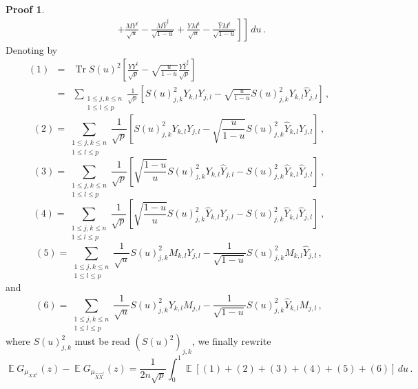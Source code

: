 \documentclass[11pt,a4paper]{article}
\DeclareMathOperator{\E}{\mathbb{E}}
\DeclareMathOperator{\1}{\mathbf{1}}
\DeclareMathOperator{\Tr}{\mathrm{Tr}}
\newcommand{\Xhat}{\widehat{X}}
\newcommand{\Yhat}{\widehat{Y}}
\theoremstyle{definition}
\newtheorem*{Proof}{Proof}
\begin{document}
\begin{Proof}
\begin{eqnarray*}
& & \quad \left. \left. + \frac{MY^t}{\sqrt{u}} - \frac{M\Yhat^t}{\sqrt{1-u}} + \frac{YM^t}{\sqrt{u}} - \frac{\Yhat M^t}{\sqrt{1-u}} \right] \right] \, du \, .
\end{eqnarray*}
Denoting by
\begin{eqnarray*}
(1) & = & \Tr S(u)^2 \left[ \frac{YY^t}{\sqrt{p}} - \sqrt{\frac{u}{1-u}} \frac{Y\Yhat^t}{\sqrt{p}} \right] \\
& = & \sum_{\substack{1 \le j,k \le n \\ 1 \le l \le p}} \frac{1}{\sqrt{p}} \left[ S(u)^2_{j,k} Y_{k,l} Y_{j,l} - \sqrt{\frac{u}{1-u}} S(u)^2_{j,k} Y_{k,l} \Yhat_{j,l} \right] \, ,
\end{eqnarray*}
\begin{displaymath}
(2) = \sum_{\substack{1 \le j,k \le n \\ 1 \le l \le p}} \frac{1}{\sqrt{p}} \left[ S(u)^2_{j,k} Y_{k,l} Y_{j,l} - \sqrt{\frac{u}{1-u}} S(u)^2_{j,k} \Yhat_{k,l} Y_{j,l} \right] \, ,
\end{displaymath}
\begin{displaymath}
(3) = \sum_{\substack{1 \le j,k \le n \\ 1 \le l \le p}} \frac{1}{\sqrt{p}} \left[ \sqrt{\frac{1-u}{u}} S(u)^2_{j,k} Y_{k,l} \Yhat_{j,l} - S(u)^2_{j,k} \Yhat_{k,l} \Yhat_{j,l} \right] \, ,
\end{displaymath}
\begin{displaymath}
(4) = \sum_{\substack{1 \le j,k \le n \\ 1 \le l \le p}} \frac{1}{\sqrt{p}} \left[ \sqrt{\frac{1-u}{u}} S(u)^2_{j,k} \Yhat_{k,l} Y_{j,l} - S(u)^2_{j,k} \Yhat_{k,l} \Yhat_{j,l} \right] \ ,
\end{displaymath}
\begin{displaymath}
(5) = \sum_{\substack{1 \le j,k \le n \\ 1 \le l \le p}} \frac{1}{\sqrt{u}} S(u)^2_{j,k} M_{k,l} Y_{j,l} - \frac{1}{\sqrt{1-u}} S(u)^2_{j,k} M_{k,l} \Yhat_{j,l} \, ,
\end{displaymath}
and
\begin{displaymath}
(6) = \sum_{\substack{1 \le j,k \le n \\ 1 \le l \le p}} \frac{1}{\sqrt{u}} S(u)^2_{j,k} Y_{k,l} M_{j,l} - \frac{1}{\sqrt{1-u}} S(u)^2_{j,k} \Yhat_{k,l} M_{j,l} \, ,
\end{displaymath}
where $S(u)^2_{j,k}$ must be read $(S(u)^2)_{j,k}$, we finally rewrite
\begin{equation} \label{freeness_general_eq1}
\E G_{\mu_{XX^t}}(z) - \E G_{\mu_{\Xhat\Xhat^t}}(z) = \frac{1}{2n\sqrt{p}} \int_0^1 \E[(1)+(2)+(3)+(4)+(5)+(6)] \, du \, .
\end{equation}\\


\end{Proof}
\end{document}
